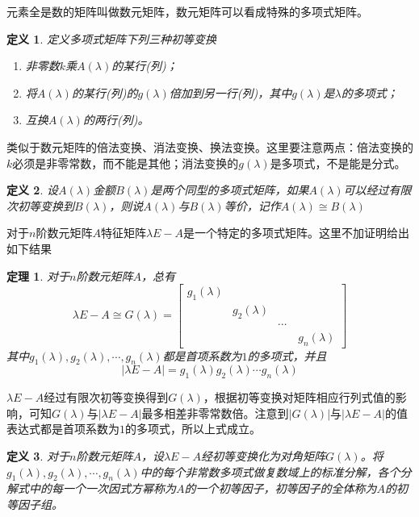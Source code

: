 \documentclass[a4paper,11pt]{article}
\newtheorem{definition}{\hspace{2em}定义}[section]
\newtheorem{theorem}{\hspace{2em}定理}[section]
\begin{document}
    元素全是数的矩阵叫做数元矩阵，数元矩阵可以看成特殊的多项式矩阵。
    \begin{definition}
        定义多项式矩阵下列三种初等变换
        \begin{enumerate}
            \item 非零数$k$乘$A(\lambda)$的某行(列)；
            \item 将$A(\lambda)$的某行(列)的$g(\lambda)$倍加到另一行(列)，其中$g(\lambda)$是$\lambda$的多项式；
            \item 互换$A(\lambda)$的两行(列)。
        \end{enumerate}
    \end{definition}
    类似于数元矩阵的倍法变换、消法变换、换法变换。这里要注意两点：倍法变换的$k$必须是非零常数，而不能是其他；消法变换的$g(\lambda)$是多项式，不是能是分式。
    \begin{definition}
        设$A(\lambda)$金额$B(\lambda)$是两个同型的多项式矩阵，如果$A(\lambda)$可以经过有限次初等变换到$B(\lambda)$，则说$A(\lambda)$与$B(\lambda)$等价，记作$A(\lambda)\cong B(\lambda)$
    \end{definition}
    对于$n$阶数元矩阵$A$特征矩阵$\lambda E-A$是一个特定的多项式矩阵。这里不加证明给出如下结果
    \begin{theorem}
        对于$n$阶数元矩阵$A$，总有
        \begin{equation*}
            \lambda E-A\cong G(\lambda)=\begin{bmatrix}
                g_1(\lambda)&\quad&\quad&\quad\\
                \quad&g_2(\lambda)&\quad&\quad\\
                \quad&\quad&\cdots&\quad\\
                \quad&\quad&\quad&g_n(\lambda)
            \end{bmatrix}
        \end{equation*}
        其中$g_1(\lambda),g_2(\lambda),\cdots,g_n(\lambda)$都是首项系数为$1$的多项式，并且
        \begin{equation*}
            |\lambda E-A|=g_1(\lambda)g_2(\lambda)\cdots g_n(\lambda)
        \end{equation*}
    \end{theorem}
    $\lambda E-A$经过有限次初等变换得到$G(\lambda)$，根据初等变换对矩阵相应行列式值的影响，可知$G(\lambda)$与$|\lambda E-A|$最多相差非零常数倍。注意到$|G(\lambda)|$与$|\lambda E-A|$的值表达式都是首项系数为$1$的多项式，所以上式成立。
    \begin{definition}
        对于$n$阶数元矩阵$A$，设$\lambda E-A$经初等变换化为对角矩阵$G(\lambda)$。将$g_1(\lambda),g_2(\lambda),\cdots,g_n(\lambda)$中的每个非常数多项式做复数域上的标准分解，各个分解式中的每一个一次因式方幂称为$A$的一个初等因子，初等因子的全体称为$A$的初等因子组。
    \end{definition}
\end{document}
